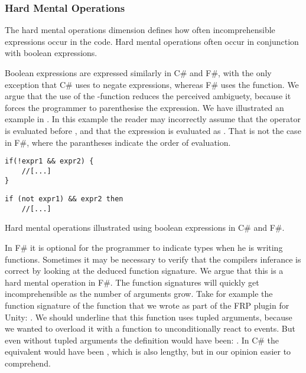 \subsubsection{Hard Mental Operations}
The hard mental operations dimension defines how often incomprehensible expressions occur in the code. Hard mental operations often occur in conjunction with boolean expressions\cite{green1996usability}.

Boolean expressions are expressed similarly in C\# and F\#, with the only exception that C\# uses \ttt{!} to negate expressions, whereas F\# uses the  function. We argue that the use of the -function reduces the perceived ambiguety, because it forces the programmer to parenthesise the expression. We have illustrated an example in . In this example the reader may incorrectly assume that the \ttt{\&\&} operator is evaluated before \ttt{!}, and that the expression is evaluated as  . That is not the case in F\#, where the parantheses indicate the order of evaluation.

\begin{listing}[H]
    \begin{minipage}{.45\textwidth}
        \begin{verbatim}
if(!expr1 && expr2) {
    //[...]
}
        \end{verbatim}
    \end{minipage}
    \hfill
    \begin{minipage}{.45\textwidth}
        \begin{verbatim}
if (not expr1) && expr2 then
    //[...]
        \end{verbatim}
    \end{minipage}
\caption{Hard mental operations illustrated using boolean expressions in C\# and F\#.}
\label{lst:hard:mental:operations}
\end{listing}

In F\# it is optional for the programmer to indicate types when he is writing functions. Sometimes it may be necessary to verify that the compilers inferance is correct by looking at the deduced function signature. We argue that this is a hard mental operation in F\#. The function signatures will quickly get incomprehensible as the number of arguments grow. Take for example the function signature of the  function that we wrote as part of the \gls{FRP} plugin for Unity: . We should underline that this function uses tupled arguments, because we wanted to overload it with a function to unconditionally react to events. But even without tupled arguments the definition would have been: . In C\# the equivalent would have been , which is also lengthy, but in our opinion easier to comprehend.